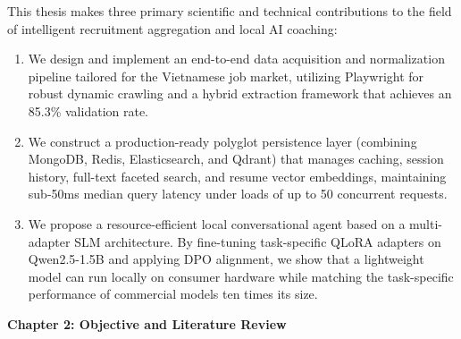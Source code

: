 \documentclass[12pt, a4paper]{report}
\begin{document}
\vspace{0.8cm}
\vspace{0.4cm}

This thesis makes three primary scientific and technical contributions to the field of intelligent recruitment aggregation and local AI coaching:

\begin{enumerate}
    \item We design and implement an end-to-end data acquisition and normalization pipeline tailored for the Vietnamese job market, utilizing Playwright for robust dynamic crawling and a hybrid extraction framework that achieves an 85.3\% validation rate.
    \item We construct a production-ready polyglot persistence layer (combining MongoDB, Redis, Elasticsearch, and Qdrant) that manages caching, session history, full-text faceted search, and resume vector embeddings, maintaining sub-50ms median query latency under loads of up to 50 concurrent requests.
    \item We propose a resource-efficient local conversational agent based on a multi-adapter SLM architecture. By fine-tuning task-specific QLoRA adapters on Qwen2.5-1.5B and applying DPO alignment, we show that a lightweight model can run locally on consumer hardware while matching the task-specific performance of commercial models ten times its size.
\end{enumerate}

\newpage
\begin{center}
    {\Huge \textbf{Chapter 2: Objective and Literature Review}\par}
\end{center}
\vspace{1cm}

\vspace{0.4cm}

\setlength{\parindent}{0.7cm}
\setlength{\parskip}{0.1cm}
\end{document}
